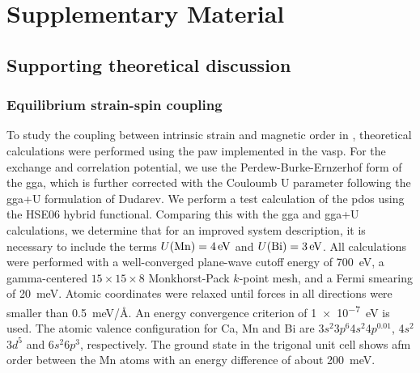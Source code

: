 \section{Supplementary Material}

\subsection{Supporting theoretical discussion}

\subsubsection{Equilibrium strain-spin coupling}\label{cmb-sec:equilibriumtheory}

To study the coupling between intrinsic strain and magnetic order in \cmb, theoretical calculations were performed using the \gls{paw} implemented in the \gls{vasp}\citep{kresse_efficient_1996, kresse_from_1999}.
For the exchange and correlation potential, we use the Perdew-Burke-Ernzerhof form of the \gls{gga}, which is further corrected with the Couloumb U parameter following the \gls{gga}+U formulation of Dudarev\citep{dudarev_electron-energy-loss_1998}.
We perform a test calculation of the \gls{pdos} using the HSE06 hybrid functional.
Comparing this with the \gls{gga} and \gls{gga}+U calculations, we determine that for an improved system description, it is necessary to include the terms $U(\ce{Mn})=\qty{4}{eV}$ and $U(\ce{Bi})=\qty{3}{eV}$.
All calculations were performed with a well-converged plane-wave cutoff energy of \qty{700}{eV}, a gamma-centered $15\times15\times8$ Monkhorst-Pack $k$-point mesh, and a Fermi smearing of \qty{20}{meV}.
Atomic coordinates were relaxed until forces in all directions were smaller than \qty{0.5}{meV/\angstrom}.
An energy convergence criterion of \qty{1e-7}{eV} is used.
The atomic valence configuration for Ca, Mn and Bi are 3$s^2$3$p^6$4$s^2$4$p^{0.01}$, 4$s^2$3$d^5$ and 6$s^2$6$p^3$, respectively.
The ground state in the trigonal unit cell shows \gls{afm} order between the Mn atoms with an energy difference of about \qty{200}{meV}.

